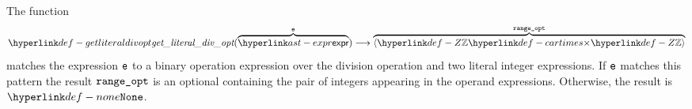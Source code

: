 \begin{mathpar}
\end{mathpar}

\hypertarget{def-getliteraldivopt}{}
The function
\[
\getliteraldivopt(\overname{\expr}{\ve}) \aslto \overname{\langle\Z\cartimes\Z\rangle}{\rangeopt}
\]
matches the expression $\ve$ to a binary operation expression over the division operation and two literal integer expressions.
If $\ve$ matches this pattern the result $\rangeopt$ is an optional containing the pair of integers appearing in the operand
expressions. Otherwise, the result is $\None$.

